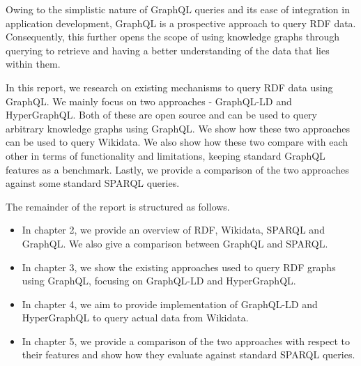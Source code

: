 Owing to the simplistic nature of GraphQL queries and its ease of integration in application development, GraphQL is a prospective approach to query RDF data. Consequently, this further opens the scope of using knowledge graphs through querying to retrieve and having a better understanding of the data that lies within them.

In this report, we research on existing mechanisms to query RDF data using GraphQL. We mainly focus on two approaches - GraphQL-LD and HyperGraphQL. Both of these are open source and can be used to query arbitrary knowledge graphs using GraphQL. We show how these two approaches can be used to query Wikidata. We also show how these two compare with each other in terms of functionality and limitations, keeping standard GraphQL features as a benchmark. Lastly, we provide a comparison of the two approaches against some standard SPARQL queries.


The remainder of the report is structured as follows.
\begin{itemize}
	\item In chapter 2, we provide an overview of RDF, Wikidata, SPARQL and GraphQL. We also give a comparison between GraphQL and SPARQL. 
	\item In chapter 3, we show the existing approaches used to query RDF graphs using GraphQL, focusing on GraphQL-LD and HyperGraphQL.
	\item In chapter 4, we aim to provide implementation of GraphQL-LD and HyperGraphQL to query actual data from Wikidata.
	\item In chapter 5, we provide a comparison of the two approaches with respect to their features and show how they evaluate against standard SPARQL queries.
\end{itemize}
